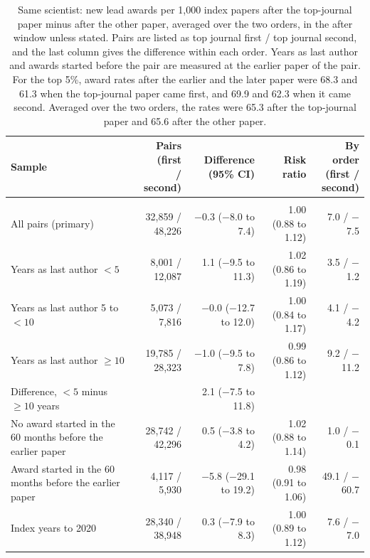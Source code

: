 \begin{table}[H]
\centering\small
\caption{Same scientist: new lead awards per 1,000 index papers after the top-journal paper minus after the other paper, averaged over the two orders, in the after window unless stated. Pairs are listed as top journal first / top journal second, and the last column gives the difference within each order. Years as last author and awards started before the pair are measured at the earlier paper of the pair. For the top 5\%, award rates after the earlier and the later paper were 68.3 and 61.3 when the top-journal paper came first, and 69.9 and 62.3 when it came second. Averaged over the two orders, the rates were 65.3 after the top-journal paper and 65.6 after the other paper.}\label{tab:s_pairs}
\footnotesize
\begin{tabularx}{\linewidth}{>{\raggedright\arraybackslash}Xrrrr}
\toprule
Sample & \makecell[rb]{Pairs (first\\/ second)} & \makecell[rb]{Difference\\(95\% CI)} & Risk ratio & \makecell[rb]{By order\\(first /\\second)} \\
\midrule
\multicolumn{5}{>{\raggedright\arraybackslash}p{\dimexpr\textwidth-2\tabcolsep\relax}}{\textit{Top 5\% against all other journals}} \\
All pairs (primary) & 32,859 / 48,226 & $-$0.3 ($-$8.0 to 7.4) & 1.00 (0.88 to 1.12) & 7.0 / $-$7.5 \\
Years as last author $<5$ & 8,001 / 12,087 & 1.1 ($-$9.5 to 11.3) & 1.02 (0.86 to 1.19) & 3.5 / $-$1.2 \\
Years as last author 5 to $<10$ & 5,073 / 7,816 & $-$0.0 ($-$12.7 to 12.0) & 1.00 (0.84 to 1.17) & 4.1 / $-$4.2 \\
Years as last author $\geq 10$ & 19,785 / 28,323 & $-$1.0 ($-$9.5 to 7.8) & 0.99 (0.86 to 1.12) & 9.2 / $-$11.2 \\
Difference, $<5$ minus $\geq 10$ years &  & 2.1 ($-$7.5 to 11.8) &  &  \\
No award started in the 60 months before the earlier paper & 28,742 / 42,296 & 0.5 ($-$3.8 to 4.2) & 1.02 (0.88 to 1.14) & 1.0 / $-$0.1 \\
Award started in the 60 months before the earlier paper & 4,117 / 5,930 & $-$5.8 ($-$29.1 to 19.2) & 0.98 (0.91 to 1.06) & 49.1 / $-$60.7 \\
Index years to 2020 & 28,340 / 38,948 & 0.3 ($-$7.9 to 8.3) & 1.00 (0.89 to 1.12) & 7.6 / $-$7.0 \\

\end{tabularx}
\end{table}
